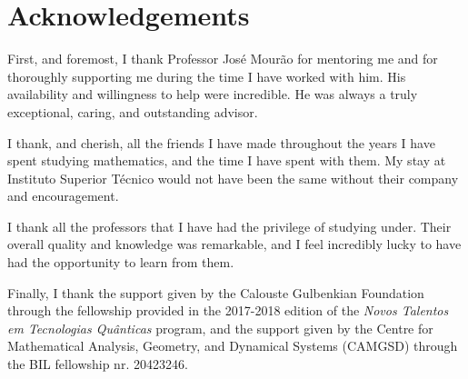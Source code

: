 \documentclass[notas.tex]{subfiles}
\begin{document}
\chapter*{Acknowledgements}

First, and foremost, I thank Professor José Mourão for mentoring me and for thoroughly supporting me during the time I have worked with him. His availability and willingness to help were incredible. He was always a truly exceptional, caring, and outstanding advisor.

I thank, and cherish, all the friends I have made throughout the years I have spent studying mathematics, and the time I have spent with them. My stay at Instituto Superior Técnico would not have been the same without their company and encouragement.

I thank all the professors that I have had the privilege of studying under. Their overall quality and knowledge was remarkable, and I feel incredibly lucky to have had the opportunity to learn from them.

Finally, I thank the support given by the Calouste Gulbenkian Foundation through the fellowship provided in the 2017-2018 edition of the \emph{Novos Talentos em Tecnologias Quânticas} program, and the support given by the Centre for Mathematical Analysis, Geometry, and Dynamical Systems (CAMGSD) through the BIL fellowship nr. 20423246.
\end{document}
